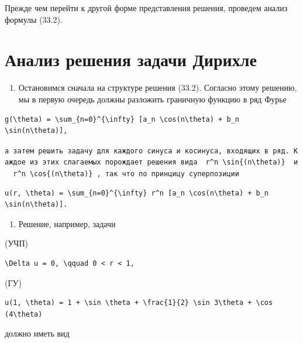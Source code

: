 \documentclass[
  ukrainian,
]{article}
\providecommand{\tightlist}{%
  \setlength{\itemsep}{0pt}\setlength{\parskip}{0pt}}
\begin{document}
Прежде чем перейти к другой форме представления решения, проведем анализ
формулы (33.2).

\section{Анализ решения задачи
Дирихле}\label{ux430ux43dux430ux43bux438ux437-ux440ux435ux448ux435ux43dux438ux44f-ux437ux430ux434ux430ux447ux438-ux434ux438ux440ux438ux445ux43bux435}

\begin{enumerate}
\def\labelenumi{\arabic{enumi}.}
\tightlist
\item
  Остановимся сначала на структуре решения (33.2). Согласно этому
  решению, мы в первую очередь должны разложить граничную функцию в ряд
  Фурье
\end{enumerate}

\begin{verbatim}
g(\theta) = \sum_{n=0}^{\infty} [a_n \cos(n\theta) + b_n \sin(n\theta)],
\end{verbatim}

\texttt{а\ затем\ решить\ задачу\ для\ каждого\ синуса\ и\ косинуса,\ входящих\ в\ ряд.\ Каждое\ из\ этих\ слагаемых\ порождает\ решения\ вида\ \ \textquotesingle{}r\^{}n\ \textbackslash{}sin\{(n\textbackslash{}theta)\}\textquotesingle{}\ \ и\ \ \textquotesingle{}r\^{}n\ \textbackslash{}cos\{(n\textbackslash{}theta)\}\textquotesingle{}\ ,\ так\ что\ по\ принцицу\ суперпозиции}

\begin{verbatim}
u(r, \theta) = \sum_{n=0}^{\infty} r^n [a_n \cos(n\theta) + b_n \sin(n\theta)].
\end{verbatim}

\begin{enumerate}
\def\labelenumi{\arabic{enumi}.}
\setcounter{enumi}{1}
\tightlist
\item
  Решение, например, задачи
\end{enumerate}

(УЧП)

\begin{verbatim}
\Delta u = 0, \qquad 0 < r < 1,
\end{verbatim}

(ГУ)

\begin{verbatim}
u(1, \theta) = 1 + \sin \theta + \frac{1}{2} \sin 3\theta + \cos (4\theta)
\end{verbatim}

должно иметь вид
\end{document}
